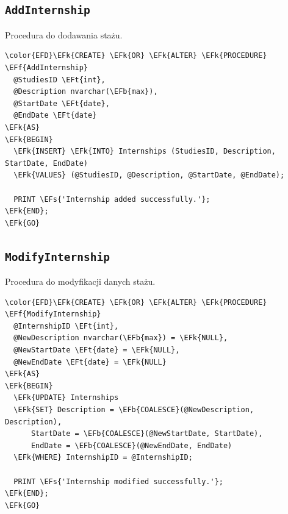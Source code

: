 \documentclass[11pt]{article}
\newcommand{\EFs}[1]{\textcolor{EFs}{#1}} %
\newcommand{\EFk}[1]{\textcolor{EFk}{\textbf{#1}}} %
\newcommand{\EFb}[1]{\textcolor{EFb}{\textbf{#1}}} %
\newcommand{\EFf}[1]{\textcolor{EFf}{#1}} %
\newcommand{\EFt}[1]{\textcolor{EFt}{\textbf{#1}}} %
\begin{document}
\subsection{\texttt{AddInternship}}
\label{sec:org2bdc2a6}
Procedura do dodawania stażu.
\begin{Code}
\begin{Verbatim}
\color{EFD}\EFk{CREATE} \EFk{OR} \EFk{ALTER} \EFk{PROCEDURE} \EFf{AddInternship}
  @StudiesID \EFt{int},
  @Description nvarchar(\EFb{max}),
  @StartDate \EFt{date},
  @EndDate \EFt{date}
\EFk{AS}
\EFk{BEGIN}
  \EFk{INSERT} \EFk{INTO} Internships (StudiesID, Description, StartDate, EndDate)
  \EFk{VALUES} (@StudiesID, @Description, @StartDate, @EndDate);

  PRINT \EFs{'Internship added successfully.'};
\EFk{END};
\EFk{GO}
\end{Verbatim}
\end{Code}
\subsection{\texttt{ModifyInternship}}
\label{sec:org9c0aa6a}
Procedura do modyfikacji danych stażu.
\begin{Code}
\begin{Verbatim}
\color{EFD}\EFk{CREATE} \EFk{OR} \EFk{ALTER} \EFk{PROCEDURE} \EFf{ModifyInternship}
  @InternshipID \EFt{int},
  @NewDescription nvarchar(\EFb{max}) = \EFk{NULL},
  @NewStartDate \EFt{date} = \EFk{NULL},
  @NewEndDate \EFt{date} = \EFk{NULL}
\EFk{AS}
\EFk{BEGIN}
  \EFk{UPDATE} Internships
  \EFk{SET} Description = \EFb{COALESCE}(@NewDescription, Description),
      StartDate = \EFb{COALESCE}(@NewStartDate, StartDate),
      EndDate = \EFb{COALESCE}(@NewEndDate, EndDate)
  \EFk{WHERE} InternshipID = @InternshipID;

  PRINT \EFs{'Internship modified successfully.'};
\EFk{END};
\EFk{GO}
\end{Verbatim}
\end{Code}
\end{document}
